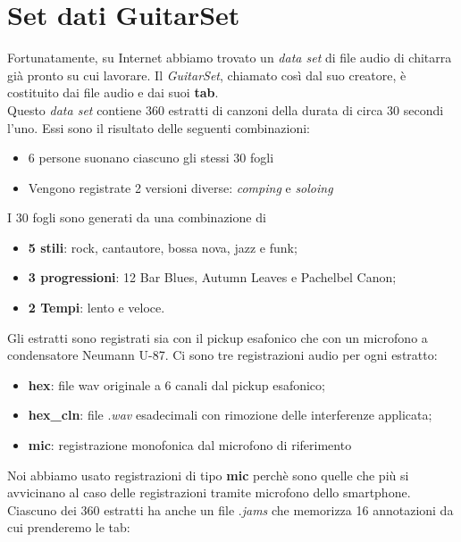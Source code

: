 \section{Set dati GuitarSet}
Fortunatamente, su Internet abbiamo trovato un \textit{data set} di file audio di chitarra già pronto su cui lavorare. Il \textit{GuitarSet}, chiamato così dal suo creatore, è costituito dai file audio e dai suoi \textbf{tab}.\\
\newline
Questo \textit{data set} contiene 360 estratti di canzoni della durata di circa 30 secondi l'uno. Essi sono il risultato delle seguenti combinazioni:
\begin{itemize}
	\item 6 persone suonano ciascuno gli stessi 30 fogli
	\item Vengono registrate 2 versioni diverse: \textit{comping} e \textit{soloing}
\end{itemize}
I 30 fogli sono generati da una combinazione di
\begin{itemize}
	\item \textbf{5 stili}: rock, cantautore, bossa nova, jazz e funk;
	\item \textbf{3 progressioni}: 12 Bar Blues, Autumn Leaves e Pachelbel Canon;
	\item \textbf{2 Tempi}: lento e veloce.
\end{itemize}
Gli estratti sono registrati sia con il pickup esafonico che con un microfono a condensatore Neumann U-87.
Ci sono tre registrazioni audio per ogni estratto:
\begin{itemize}
	\item \textbf{hex}: file wav originale a 6 canali dal pickup esafonico;
	\item \textbf{hex\_cln}: file .\textit{wav} esadecimali con rimozione delle interferenze applicata;
	\item \textbf{mic}: registrazione monofonica dal microfono di riferimento
\end{itemize}
Noi abbiamo usato registrazioni di tipo \textbf{mic} perchè sono quelle che più si avvicinano al caso delle registrazioni tramite microfono dello smartphone.\\
\newline
Ciascuno dei 360 estratti ha anche un file .\textit{jams} che memorizza 16 annotazioni da cui prenderemo le tab:
